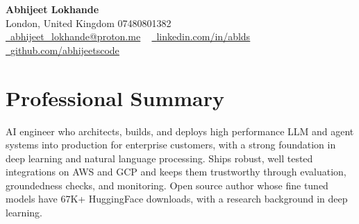\documentclass[a4paper,10pt]{article}
\begin{document}
    \begin{center}
        {\Huge\bfseries Abhijeet Lokhande}
        \\[2pt] {\color{muted}London, United Kingdom \textbar{} 07480801382}\\
        \small
        \href{mailto:abhijeet_lokhande@proton.me}{\raisebox{-0.2\height}{\color{primary}\faEnvelope}\  \underline{abhijeet\_lokhande@proton.me}} ~
        \href{https://www.linkedin.com/in/ablds/}{\raisebox{-0.2\height}{\color{primary}\faLinkedin}\ \underline{linkedin.com/in/ablds}}  ~
        \href{https://github.com/abhijeetscode}{\raisebox{-0.2\height}{\color{primary}\faGithub}\ \underline{github.com/abhijeetscode}}
    \end{center}

\section{Professional Summary}
\vspace{-5pt}
{\color{muted}AI engineer who architects, builds, and deploys high performance LLM and agent systems into production for enterprise customers, with a strong foundation in deep learning and natural language processing. Ships robust, well tested integrations on AWS and GCP and keeps them trustworthy through evaluation, groundedness checks, and monitoring. Open source author whose fine tuned models have 67K+ HuggingFace downloads, with a research background in deep learning.}
\vspace{2pt}

\end{document}
